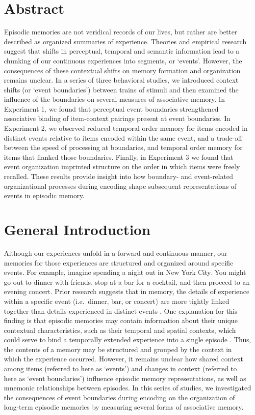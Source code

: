 \section{Abstract}\label{abstract}

Episodic memories are not veridical records of our lives, but rather are
better described as organized summaries of experience. Theories and
empirical research suggest that shifts in perceptual, temporal and
semantic information lead to a chunking of our continuous experiences
into segments, or `events'. However, the consequences of these
contextual shifts on memory formation and organization remains unclear.
In a series of three behavioral studies, we introduced context shifts
(or `event boundaries') between trains of stimuli and then examined the
influence of the boundaries on several measures of associative memory.
In Experiment 1, we found that perceptual event boundaries strengthened
associative binding of item-context pairings present at event
boundaries. In Experiment 2, we observed reduced temporal order memory
for items encoded in distinct events relative to items encoded within
the same event, and a trade-off between the speed of processing at
boundaries, and temporal order memory for items that flanked those
boundaries. Finally, in Experiment 3 we found that event organization
imprinted structure on the order in which items were freely recalled.
These results provide insight into how boundary- and event-related
organizational processes during encoding shape subsequent
representations of events in episodic memory.

\section{General Introduction}\label{general-introduction}

Although our experiences unfold in a forward and continuous manner, our
memories for those experiences are structured and organized around
specific events. For example, imagine spending a night out in New York
City. You might go out to dinner with friends, stop at a bar for a
cocktail, and then proceed to an evening concert. Prior research
suggests that in memory, the details of experience within a specific
event (i.e.~dinner, bar, or concert) are more tightly linked together
than details experienced in distinct events
\autocites{ezzyat_what_2011}{dubrow_influence_2013}. One explanation for
this finding is that episodic memories may contain information about
their unique contextual characteristics, such as their temporal and
spatial contexts, which could serve to bind a temporally extended
experience into a single episode \autocite{tulving_organization_1995}.
Thus, the contents of a memory may be structured and grouped by the
context in which the experience occurred. However, it remains unclear
how shared context among items (referred to here as `events') and
changes in context (referred to here as `event boundaries') influence
episodic memory representations, as well as mnemonic relationships
between episodes. In this series of studies, we investigated the
consequences of event boundaries during encoding on the organization of
long-term episodic memories by measuring several forms of associative
memory.

